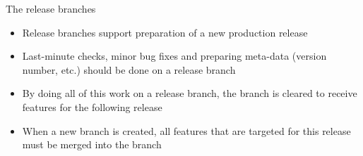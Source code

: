 \documentclass[usenames,svgnames,14pt]{beamer}
\begin{document}
\begin{frame}[fragile,c]{The release branches}
\begin{onlyenv}
\begin{minipage}[c]{0.95\textwidth}
            \setlength{\leftmargini}{1mm}
            \begin{itemize}
                \setlength{\itemsep}{3mm}
                \item Release branches support preparation of a new production release
                \item Last-minute checks, minor bug fixes and preparing meta-data (version number,
                etc.) should be done on a release branch
                \item By doing all of this work on a release branch, the 
                branch is cleared to receive features for the following release
                \item \alert{When a new  branch is created, all features that are
                    targeted for this release must be merged into the  branch}
            \end{itemize}
        \end{minipage}
    \end{onlyenv}
\end{frame}
\end{document}

